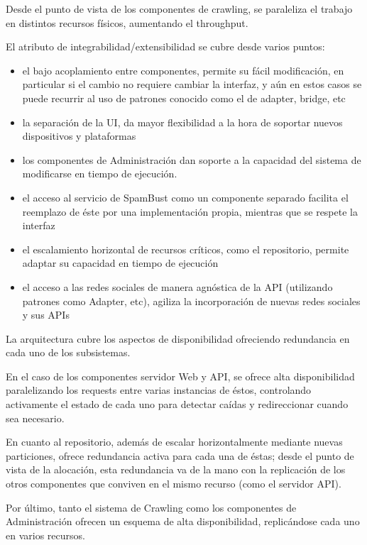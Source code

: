 Desde el punto de vista de los componentes de crawling, se paraleliza el trabajo en distintos recursos f\'isicos, aumentando el throughput.

El atributo de integrabilidad/extensibilidad se cubre desde varios puntos:

\begin{itemize}
\item el bajo acoplamiento entre componentes, permite su f\'acil modificaci\'on, en particular si el cambio no requiere cambiar la interfaz, y a\'un en estos casos se puede recurrir al uso de patrones conocido como el de adapter, bridge, etc
\item la separaci\'on de la UI, da mayor flexibilidad a la hora de soportar nuevos dispositivos y plataformas
\item los componentes de Administraci\'on dan soporte a la capacidad del sistema de modificarse en tiempo de ejecuci\'on.
\item el acceso al servicio de SpamBust como un componente separado facilita el reemplazo de \'este por una implementaci\'on propia, mientras que se respete la interfaz
\item el escalamiento horizontal de recursos cr\'iticos, como el repositorio, permite adaptar su capacidad en tiempo de ejecuci\'on
\item el acceso a las redes sociales de manera agn\'ostica de la API (utilizando patrones como Adapter, etc), agiliza la incorporaci\'on de nuevas redes sociales y sus APIs
\end{itemize}
  
La arquitectura cubre los aspectos de disponibilidad ofreciendo redundancia en cada uno de los subsistemas.

En el caso de los componentes servidor Web y API, se ofrece alta disponibilidad paralelizando los requests entre varias instancias de \'estos, controlando activamente el estado de cada uno para detectar ca\'idas y redireccionar cuando sea necesario.

En cuanto al repositorio, adem\'as de escalar horizontalmente mediante nuevas particiones, ofrece redundancia activa para cada una de \'estas; desde el punto de vista de la alocaci\'on, esta redundancia va de la mano con la replicaci\'on de los otros componentes que conviven en el mismo recurso (como el servidor API).

Por \'ultimo, tanto el sistema de Crawling como los componentes de Administraci\'on ofrecen un esquema de alta disponibilidad, replic\'andose cada uno en varios recursos.


